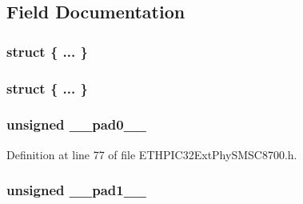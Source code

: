 \subsection{Field Documentation}
\hypertarget{union_____s_i_l_i_c_o_n_r_e_vbits__t_a8c36c5eaebd233caa87fd6bc96056a0c}{}\subsubsection[{"@212}]{\setlength{\rightskip}{0pt plus 5cm}struct \{ ... \} }\label{union_____s_i_l_i_c_o_n_r_e_vbits__t_a8c36c5eaebd233caa87fd6bc96056a0c}
\hypertarget{union_____s_i_l_i_c_o_n_r_e_vbits__t_ab956e2b20027663e41d9c67d804c6eaa}{}\subsubsection[{"@214}]{\setlength{\rightskip}{0pt plus 5cm}struct \{ ... \} }\label{union_____s_i_l_i_c_o_n_r_e_vbits__t_ab956e2b20027663e41d9c67d804c6eaa}
\hypertarget{union_____s_i_l_i_c_o_n_r_e_vbits__t_adf71f3d8410c1f1dbbc96680a92c49af}{}
\subsubsection[{\+\_\+\+\_\+pad0\+\_\+\+\_\+}]{\setlength{\rightskip}{0pt plus 5cm}unsigned \+\_\+\+\_\+pad0\+\_\+\+\_\+}\label{union_____s_i_l_i_c_o_n_r_e_vbits__t_adf71f3d8410c1f1dbbc96680a92c49af}


Definition at line 77 of file E\+T\+H\+P\+I\+C32\+Ext\+Phy\+S\+M\+S\+C8700.\+h.

\hypertarget{union_____s_i_l_i_c_o_n_r_e_vbits__t_acaf2d0924a107ec6e8d2e31febaf66f9}{}
\subsubsection[{\+\_\+\+\_\+pad1\+\_\+\+\_\+}]{\setlength{\rightskip}{0pt plus 5cm}unsigned \+\_\+\+\_\+pad1\+\_\+\+\_\+}\label{union_____s_i_l_i_c_o_n_r_e_vbits__t_acaf2d0924a107ec6e8d2e31febaf66f9}


